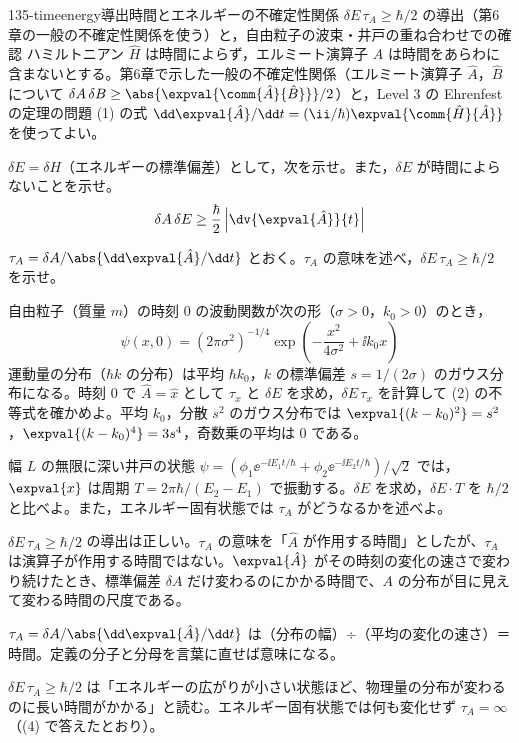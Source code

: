 \documentclass[uplatex,dvipdfmx,a4paper,11pt]{jsarticle}
\begin{document}
\begin{mondai}{135-timeenergy}{導出}{時間とエネルギーの不確定性関係 $\delta E\,\tau_{A}\ge\hbar/2$ の導出（第6章の一般の不確定性関係を使う）と，自由粒子の波束・井戸の重ね合わせでの確認}
ハミルトニアン $\hat{H}$ は時間によらず，エルミート演算子 $\hat{A}$ は時間をあらわに含まないとする。第6章で示した一般の不確定性関係（エルミート演算子 $\hat{A}$，$\hat{B}$ について $\delta A\,\delta B\ge\abs{\expval{\comm{\hat{A}}{\hat{B}}}}/2$）と，Level 3 の Ehrenfest の定理の問題 (1) の式 $\dd\expval{\hat{A}}/\dd t=(\ii/\hbar)\expval{\comm{\hat{H}}{\hat{A}}}$ を使ってよい。
  \begin{shoumon}
    \item $\delta E=\delta H$（エネルギーの標準偏差）として，次を示せ。また，$\delta E$ が時間によらないことを示せ。
    \[ \delta A\,\delta E\ge\frac{\hbar}{2}\left|\dv{\expval{\hat{A}}}{t}\right| \]
    \item $\tau_{A}=\delta A/\abs{\dd\expval{\hat{A}}/\dd t}$ とおく。$\tau_{A}$ の意味を述べ，$\delta E\,\tau_{A}\ge\hbar/2$ を示せ。
    \item 自由粒子（質量 $m$）の時刻 $0$ の波動関数が次の形（$\sigma>0$，$k_{0}>0$）のとき，
    \[ \psi(x,0)=(2\pi\sigma^{2})^{-1/4}\exp\left(-\frac{x^{2}}{4\sigma^{2}}+\ii k_{0}x\right) \]
    運動量の分布（$\hbar k$ の分布）は平均 $\hbar k_{0}$，$k$ の標準偏差 $s=1/(2\sigma)$ のガウス分布になる。時刻 $0$ で $\hat{A}=\hat{x}$ として $\tau_{x}$ と $\delta E$ を求め，$\delta E\,\tau_{x}$ を計算して (2) の不等式を確かめよ。平均 $k_{0}$，分散 $s^{2}$ のガウス分布では $\expval{(k-k_{0})^{2}}=s^{2}$，$\expval{(k-k_{0})^{4}}=3s^{4}$，奇数乗の平均は $0$ である。
    \item 幅 $L$ の無限に深い井戸の状態 $\psi=(\phi_{1}\ee^{-\ii E_{1}t/\hbar}+\phi_{2}\ee^{-\ii E_{2}t/\hbar})/\sqrt{2}$ では，$\expval{x}$ は周期 $T=2\pi\hbar/(E_{2}-E_{1})$ で振動する。$\delta E$ を求め，$\delta E\cdot T$ を $\hbar/2$ と比べよ。また，エネルギー固有状態では $\tau_{A}$ がどうなるかを述べよ。
  \end{shoumon}

\begin{kotaeran}
   $\delta E\,\tau_{A}\ge\hbar/2$ の導出は正しい。$\tau_{A}$ の意味を「$\hat{A}$ が作用する時間」としたが、$\tau_{A}$ は演算子が作用する時間ではない。$\expval{\hat{A}}$ がその時刻の変化の速さで変わり続けたとき、標準偏差 $\delta A$ だけ変わるのにかかる時間で、$A$ の分布が目に見えて変わる時間の尺度である。
\end{kotaeran}
\begin{rikai}
  \item $\tau_{A}=\delta A/\abs{\dd\expval{\hat{A}}/\dd t}$ は（分布の幅）÷（平均の変化の速さ）＝時間。定義の分子と分母を言葉に直せば意味になる。
  \item $\delta E\,\tau_{A}\ge\hbar/2$ は「エネルギーの広がりが小さい状態ほど、物理量の分布が変わるのに長い時間がかかる」と読む。エネルギー固有状態では何も変化せず $\tau_{A}=\infty$（(4) で答えたとおり）。
\end{rikai}
\end{mondai}
\end{document}
